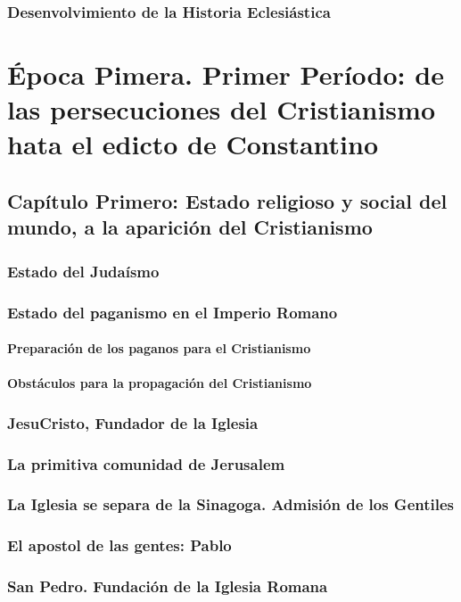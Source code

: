 \raggedbottom{} \documentclass[12pt, a4paper]{book}
\begin{document}
\section{Desenvolvimiento de la Historia Eclesiástica}
\part{Época Pimera. Primer Período: de las persecuciones del Cristianismo hata el edicto de Constantino}
\chapter{Capítulo Primero: Estado religioso y social del mundo, a la aparición del Cristianismo}
\section{Estado del Judaísmo}
\section{Estado del paganismo en el Imperio Romano}
\subsection{Preparación de los paganos para el Cristianismo}
\subsection{Obstáculos para la propagación del Cristianismo}
\section{JesuCristo, Fundador de la Iglesia}
\section{La primitiva comunidad de Jerusalem}
\section{La Iglesia se separa de la Sinagoga. Admisión de los Gentiles}
\section{El apostol de las gentes: Pablo}
\section{San Pedro. Fundación de la Iglesia Romana}
\end{document}
